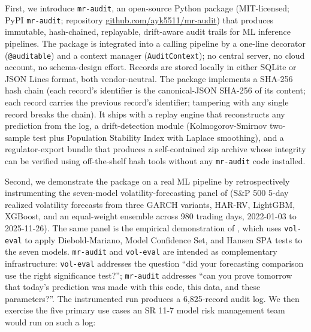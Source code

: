 First, we introduce \texttt{mr-audit}, an open-source Python package (MIT-licensed; PyPI \texttt{mr-audit}; repository \href{https://github.com/ayk5511/mr-audit}{github.com/ayk5511/mr-audit}) that produces immutable, hash-chained, replayable, drift-aware audit trails for ML inference pipelines. The package is integrated into a calling pipeline by a one-line decorator (\verb|@auditable|) and a context manager (\texttt{AuditContext}); no central server, no cloud account, no schema-design effort. Records are stored locally in either SQLite or JSON Lines format, both vendor-neutral. The package implements a SHA-256 hash chain (each record's identifier is the canonical-JSON SHA-256 of its content; each record carries the previous record's identifier; tampering with any single record breaks the chain). It ships with a replay engine that reconstructs any prediction from the log, a drift-detection module (Kolmogorov-Smirnov two-sample test plus Population Stability Index with Laplace smoothing), and a regulator-export bundle that produces a self-contained zip archive whose integrity can be verified using off-the-shelf hash tools without any \texttt{mr-audit} code installed.

Second, we demonstrate the package on a real ML pipeline by retrospectively instrumenting the seven-model volatility-forecasting panel of \citet{KhanVol2026} (S\&P 500 5-day realized volatility forecasts from three GARCH variants, HAR-RV, LightGBM, XGBoost, and an equal-weight ensemble across 980 trading days, 2022-01-03 to 2025-11-26). The same panel is the empirical demonstration of \citet{Khan2026VolEval}, which uses \texttt{vol-eval} to apply Diebold-Mariano, Model Confidence Set, and Hansen SPA tests to the seven models. \texttt{mr-audit} and \texttt{vol-eval} are intended as complementary infrastructure: \texttt{vol-eval} addresses the question ``did your forecasting comparison use the right significance test?''; \texttt{mr-audit} addresses ``can you prove tomorrow that today's prediction was made with this code, this data, and these parameters?''. The instrumented run produces a 6,825-record audit log. We then exercise the five primary use cases an SR 11-7 model risk management team would run on such a log:

